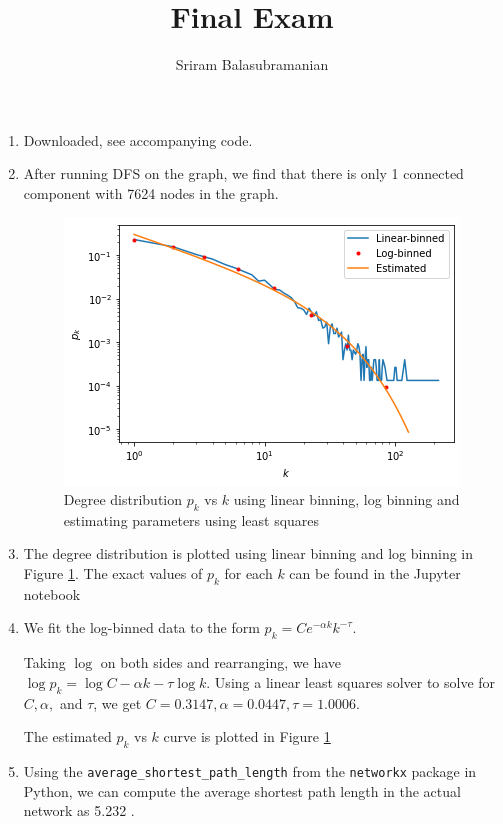 \documentclass{article}
\title{\textbf{Final Exam}}
\author{Sriram Balasubramanian}
\begin{document}
 \maketitle

\begin{enumerate}

\item Downloaded, see accompanying code.

\item After running DFS on the graph, we find that there is only 1 connected component with 7624 nodes in the graph. 

\begin{figure}
\centering
\includegraphics[scale=0.5]{pk_vs_k.png}
\caption{Degree distribution $p_k$ vs $k$ using linear binning, log binning and estimating parameters using least squares}
\label{fig:pk_vs_k}
\end{figure}

\item The degree distribution is plotted using linear binning and log binning in Figure \ref{fig:pk_vs_k}. The exact values of $p_k$ for each $k$ can be found in the Jupyter notebook

\item We fit the log-binned data to the form $p_k = Ce^{-\alpha k}k^{-\tau}$.

  Taking $\log$ on both sides and rearranging, we have $\log p_k = \log C -\alpha k -\tau \log k$. Using a linear least squares solver to solve for $C, \alpha, $ and $\tau$, we get $C = 0.3147, \alpha=0.0447, \tau = 1.0006$.
  
  The estimated $p_k$ vs $k$ curve is plotted in Figure \ref{fig:pk_vs_k}

\item Using the \texttt{average\_shortest\_path\_length} from the \texttt{networkx} package in Python, we can compute the average shortest path length in the actual network as 5.232 .


\end{enumerate}
\end{document}
